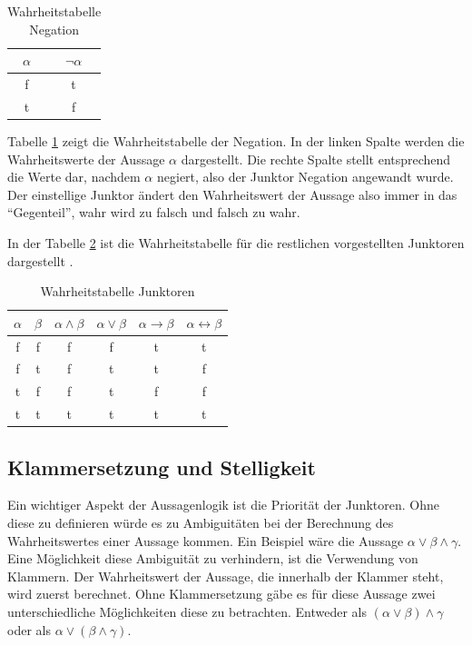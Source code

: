 \begin{table}[h]
\begin{center}
\begin{tabular}{c|c}
$\alpha$ & $\neg\alpha$ \\
\hline
f & t \\
t & f
\end{tabular}
\end{center}
\caption{\label{tbl_neg}Wahrheitstabelle Negation}
\end{table}

Tabelle \ref{tbl_neg} zeigt die Wahrheitstabelle der Negation. In der linken Spalte werden die Wahrheitswerte der Aussage $\alpha$ dargestellt. Die rechte Spalte stellt entsprechend die Werte dar, nachdem $\alpha$ negiert, also der Junktor Negation angewandt wurde. Der einstellige Junktor ändert den Wahrheitswert der Aussage also immer in das ``Gegenteil'', wahr wird zu falsch und falsch zu wahr.

In der Tabelle \ref{tbl_prop_logic} ist die Wahrheitstabelle für die restlichen vorgestellten Junktoren dargestellt \cite{KB14}.
\begin{table}[h]
\begin{center}
\begin{tabular}{c|c|c|c|c|c}
$\alpha$ & $\beta$ & $\alpha\wedge\beta$ & $\alpha\vee\beta$ & $\alpha\rightarrow\beta$ & $\alpha\leftrightarrow\beta$ \\
\hline
f & f & f & f & t & t \\
f & t & f & t & t & f \\
t & f & f & t & f & f\\
t & t & t & t & t & t\\
\end{tabular}
\end{center}
\caption{\label{tbl_prop_logic}Wahrheitstabelle Junktoren}
\end{table}

\subsection{\label{clamps_and_prio}Klammersetzung und Stelligkeit}
Ein wichtiger Aspekt der Aussagenlogik ist die Priorität der Junktoren. Ohne diese zu definieren würde es zu Ambiguitäten bei der Berechnung des Wahrheitswertes einer Aussage kommen. Ein Beispiel wäre die Aussage $\alpha\vee\beta\wedge\gamma$. Eine Möglichkeit diese Ambiguität zu verhindern, ist die Verwendung von Klammern. Der Wahrheitswert der Aussage, die innerhalb der Klammer steht, wird zuerst berechnet. Ohne Klammersetzung gäbe es für diese Aussage zwei unterschiedliche Möglichkeiten diese zu betrachten. Entweder als $(\alpha\vee\beta)\wedge\gamma$ oder als $\alpha\vee(\beta\wedge\gamma)$.


